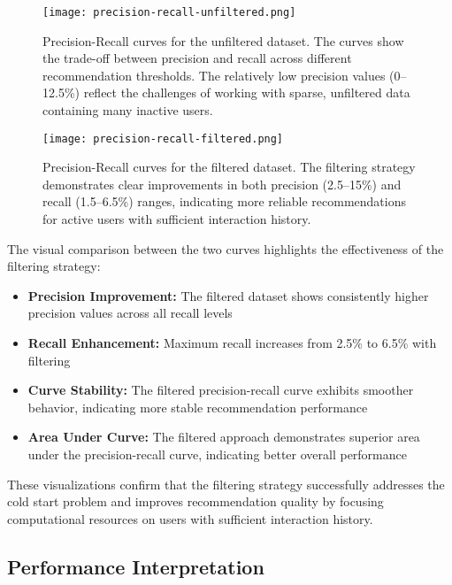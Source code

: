 \documentclass[12pt,a4paper]{article}
\begin{document}
\begin{figure}[htbp]
    \centering
    \texttt{[image: precision-recall-unfiltered.png]}
    \caption{Precision-Recall curves for the unfiltered dataset. The curves show the trade-off between precision and recall across different recommendation thresholds. The relatively low precision values (0--12.5\%) reflect the challenges of working with sparse, unfiltered data containing many inactive users.}
    \label{fig:precision-recall-unfiltered}
\end{figure}

\begin{figure}[htbp]
    \centering
    \texttt{[image: precision-recall-filtered.png]}
    \caption{Precision-Recall curves for the filtered dataset. The filtering strategy demonstrates clear improvements in both precision (2.5--15\%) and recall (1.5--6.5\%) ranges, indicating more reliable recommendations for active users with sufficient interaction history.}
    \label{fig:precision-recall-filtered}
\end{figure}

The visual comparison between the two curves highlights the effectiveness of the filtering strategy:

\begin{itemize}
    \item \textbf{Precision Improvement:} The filtered dataset shows consistently higher precision values across all recall levels
    \item \textbf{Recall Enhancement:} Maximum recall increases from 2.5\% to 6.5\% with filtering
    \item \textbf{Curve Stability:} The filtered precision-recall curve exhibits smoother behavior, indicating more stable recommendation performance
    \item \textbf{Area Under Curve:} The filtered approach demonstrates superior area under the precision-recall curve, indicating better overall performance
\end{itemize}

These visualizations confirm that the filtering strategy successfully addresses the cold start problem and improves recommendation quality by focusing computational resources on users with sufficient interaction history.

\subsection{Performance Interpretation}
\end{document}
